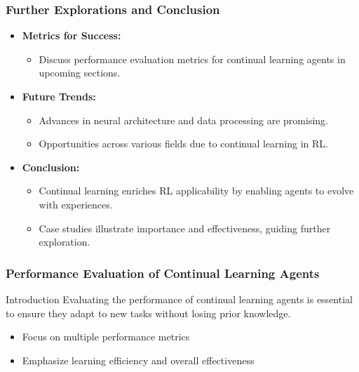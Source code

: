 \documentclass[aspectratio=169]{beamer}
\begin{document}
\begin{frame}[fragile]
    \frametitle{Further Explorations and Conclusion}
    \begin{itemize}
        \item \textbf{Metrics for Success:} 
            \begin{itemize}
                \item Discuss performance evaluation metrics for continual learning agents in upcoming sections.
            \end{itemize}

        \item \textbf{Future Trends:} 
            \begin{itemize}
                \item Advances in neural architecture and data processing are promising.
                \item Opportunities across various fields due to continual learning in RL.
            \end{itemize}

        \item \textbf{Conclusion:} 
            \begin{itemize}
                \item Continual learning enriches RL applicability by enabling agents to evolve with experiences.
                \item Case studies illustrate importance and effectiveness, guiding further exploration.
            \end{itemize}
    \end{itemize}
\end{frame}

\begin{frame}[fragile]
    \frametitle{Performance Evaluation of Continual Learning Agents}
    \begin{block}{Introduction}
        Evaluating the performance of continual learning agents is essential to ensure they adapt to new tasks without losing prior knowledge. 
    \end{block}
    \begin{itemize}
        \item Focus on multiple performance metrics
        \item Emphasize learning efficiency and overall effectiveness
    \end{itemize}
\end{frame}
\end{document}
